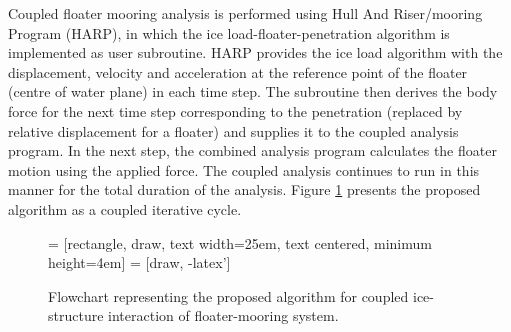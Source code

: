 \documentclass[review]{elsarticle}
\begin{document}
Coupled floater mooring analysis is performed using Hull And Riser/mooring Program (HARP), in which the ice load-floater-penetration algorithm is implemented as user subroutine. HARP provides the ice load algorithm with the displacement, velocity and acceleration at the reference point of the floater (centre of water plane) in each time step. The subroutine then derives the body force for the next time step corresponding to the penetration (replaced by relative displacement for a floater) and supplies it to the coupled analysis program. In the next step, the combined analysis program calculates the floater motion using the applied force. The coupled analysis continues to run in this manner for the total duration of the analysis. Figure \ref{flowchart} presents the proposed algorithm as a coupled iterative cycle.
\begin{figure}
	\begin{center}
		 = [rectangle, draw, text width=25em, text centered, minimum height=4em]
		 = [draw, -latex']
		\caption{Flowchart representing the proposed algorithm for coupled ice-structure interaction of floater-mooring system.}
		\label{flowchart}
	\end{center}
\end{figure}


\end{document}
